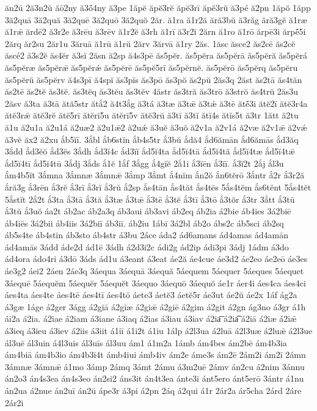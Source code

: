 {ăn2ū
2ă3n2ŭ
ăō2ny
ă3ṓ4ny
ă3pe
1ăpĕ
ăpĕ3rĕ
ăpĕ3rī
ăpĕ3rŭ
ă3pé
ă2pn
1ăpŏ
1ăpp
3ă2quā
3ă2quă
3ă2quē
3ă2quō
3ă2quŏ
2ăr.
ă1ra
ă1r2ă
ără3bŭ
ă3răg
ără3gĕ
ă1ræ
ă1rǣ
ărdē2
ă3r2e
ă3rēu
ă3rēv
ă1r2ĕ
ă3rh
ă1rī
ă3r2ĭ
2ărn
ă1ro
ă1rō
ărpē3i
ărpḗ5i
2ărq
ăr2su
2ăr1u
3ăruā
ă1rū
ă1rŭ
2ărv
3ărvā
ă1ry
2ăs.
1ăsc
ăsce2
ăs2cē
ăs2cĕ
ăscé2
ă3s2ĕ
ăs4ĕr
ă3sĭ
2ăsn
ă2sp
ă4s3pē
ăs5pĕr.
ăs5pĕra
ăs5pĕrā
ăs5pĕră
ăs5pĕrá
ăs5pĕræ
ăs5pĕrǣ
ăs5pĕrǽ
ăs5pĕrē
ăs5pĕ5rī
ăs5pĕrnĕ.
ăs5pĕrō
ăs5pĕrq
ăs5pĕru
ăs5pĕrŭ
ăs5pĕrv
ă4s3pī
ă4spĭ
ăs3pĭs
ăs3pō
ăs3pŏ
ăs2pŭ
2ăs3q
2ăst
ăs2tā
ăs4tăn
ăs2tē
ăs2tĕ
ăs3tĕ.
ăs3tĕq
ăs3tĕu
ăs3tĕv
4ăstr
ăs3tră
ăs3trō
ă3strŏ
ăs4trŭ
2ăs3u
2ăsv
ă3ta
ă3tā
ătă5str
ătắ2
ă4t3ắg
ă3tá
ă3tæ
ă3tǣ
ă3tǽ
ă3tē
ătḗ3i
ătĕ2ī
ătĕ3r4a
ătĕ3rǣ
ătĕ3rĕ
ătĕ5rī
ătĕrī5u
ătĕrī5v
ătĕ3rŭ
ă3tī
ă3tĭ
ătĭ4s
ătĭs5t
ă3tr
1ătt
ă2tu
ă1u
ă2u1a
ă2u1á
ă2uæ2
ă2u1ǣ2
ă2uǽ
ă3uĕ
ă3uŏ
ă2v1a
ă2v1á
ă2væ
ă2v1ǣ
ă2vǽ
ă3vĕ
ăx2
ă2xu
ắb5ĭī.
3ắbl
ắb6stĭn
ắb4s5tr
ắ3bŭ
ắdă4
ắd6ămān
ắd6ămās
ắd3ăq
3ắdd
ắd3ĕŏ
ắd3ĕs
3ắdh
ắd3ĭ4c
ắd3ĭĭ
ắd5ĭ4ta
ắd5ĭ4tā
ắd5ĭ4tă
ắd5ĭ4tæ
ắd5ĭ4tǣ
ắd5ĭ4tī
ắd5ĭ4tū
3ắdj
3ắds
ắ1ĕ
1ắf
3ắgg
ắ4gĭĕ
2ắ1i
ắ3ĭēn
ắ3ĭī.
ắ3ĭ2t
2ắj
ắl3u
ắm4b5ĭt
3ắmna
3ắmnæ
3ắmnǣ
3ắmp
3ắmt
ắ4nĭm
ắn2ŏ
ắn6tĕrō
3ắntr
ắ2r
ắ3r2ă
ắră3g
ắ3rēn
ắ3rĕ
ắ3rī
ắ3rĭ
ắ3rŭ
ắ2sp
ắs4tān
ắs4tăt
ắs4tēs
5ắs4tĕm
ắs6tĕnt
5ắs4tĕt
5ắstĭt
2ắ2t
ắ3ta
ắ3tā
ắ3tă
ắ3tæ
ắ3tǣ
ắ3tē
ắ3tĕ
ắ3tī
ắ3tō
ắ3tŏr
ắ3tr
3ắtt
ắ3tū
ắ3tŭ
ắ3uŏ
áa2t
áb2ac
áb2a3q
áb3aui
áb3avi
áb2eq
áb2ia
á2bie
áb4ies
3á2biē
áb4iēs
3á2bii
áb4iis
3á2biī
áb3iī.
áb2iu
1ábī
3á2bl
áb2o
ábs2c
áb5sci
áb2sq
áb5s4te
áb4stin
áb3sto
áb4str
á3bu
2áce
áda2
ád6amans
ád4amas
ád4amān
ád4amās
3ádd
áde2d
ád1ē
3ádh
á2d3i2c
ádi2g
ád2ip
ádi3pi
3ádj
1ádm
á3do
ád4ora
ádo4ri
á3dō
3áds
ád1u
á3eant
á3eat
áe2ă
áe4cue
áe3d2
áe2eo
áe2eō
áe3es
áe3g2
áei2
2áen
2áe3q
3áequa
3áequā
3áequă
5áequem
5áequer
5áeques
5áequet
3áequē
5áequĕm
5áequĕr
5áequĕt
3áequo
3áequō
3áequŏ
áe1r
áer4i
áes4ca
áes4ci
áes4ta
áes4te
áes4tē
áes4tī
áes4tō
áete3
áetĕ3
áetĕ5r
áe3ut
áe2ŭ
áe2x
1áf
ág2a
á3gæ
1áge
á2ger
3ágg
á2giā
á2giæ
á2giǣ
á2giē
á2gim
á2git
á2gn
ág3no
á3gr
á1h
ái2a
á2ia.
á2iae
á2iam
á3iane
á3iaq
á2ias
á3iau
á3iav
á2ia͞
á2ia͡
á2iā
á2iæ
á2iǣ
á3ieq
á3ieu
á3iev
á2iis
á3iit
á1iī
á1i2t
á1iu
1álp
á2l3ua
á2luā
á2l3uæ
á2luǣ
á2l3ue
ál3uē
ál3uin
á4l3uis
ál3uīs
ál3uu
ám1
á1m2a
1ámb
ám4bes
ám2bē
ám4b3ia
ám4biā
ám4b3io
ám4b3i4t
ámb4iui
ámb4iv
ám2e
áme3s
ám2ē
2ám2i
ám2ī
2ámn
3ámnæ
3ámnǣ
á1mo
3ámp
2ámq
3ámt
2ámu
á3m2uē
2ámv
án2cu
á2nim
3ánnu
án2o3
án4s3ea
án4s3eo
án2si2
áns3it
án4t3ea
ánte3i
ánt5ero
ánt5erō
3ántr
á1nu
án2ua
á2nue
án2uī
án2ū
ápe3r
á3pi
á2pn
2áq
á2qui
á1r
2ár2a
ár5cha
2árd
2áre
2ár2i
}
